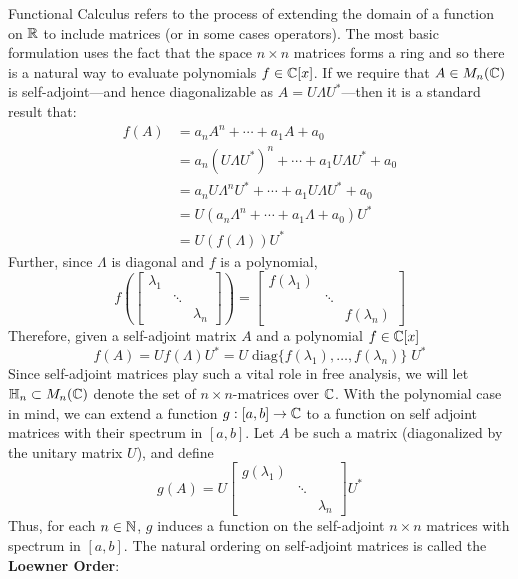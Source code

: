 Functional Calculus refers to the process of extending the domain of a function
on \(\mathbb{R}\) to include matrices (or in some cases operators). The most basic
formulation uses the fact that the space \(n \times n\) matrices forms a ring
and so there is a natural way to evaluate polynomials \(f \in \mathbb{C} [x]\). If we
require that $A \in M_n(\mathbb{C})$ is self-adjoint---and hence diagonalizable as
$A = U \Lambda U^*$---then it is a standard result that:
\begin{align*}
  f(A) &= a_nA^n + \cdots + a_1A + a_0 \\
  &= a_n \left( U\Lambda U^* \right) ^n + \cdots + a_1 U\Lambda U^* + a_0 \\
  &= a_n U\Lambda^n U^* + \cdots + a_1 U\Lambda U^* + a_0 \\
  &= U \left( a_n\Lambda ^n + \cdots + a_1\Lambda + a_0 \right) U^* \\
  &= U \left( f(\Lambda) \right) U^*
\end{align*}
Further, since \(\Lambda\) is diagonal and $f$ is a polynomial,
\[
  f \left( \begin{bmatrix} \lambda_1 &  &  \\  & \ddots &  \\  &  & \lambda_n \end{bmatrix}  \right)
  = \begin{bmatrix} f(\lambda_1) &  &  \\  & \ddots &  \\  &  & f(\lambda_n) \end{bmatrix}
\]
Therefore, given a self-adjoint matrix \(A\) and a polynomial \(f \in \mathbb{C} [x]\)
\[
  f(A) = Uf(\Lambda)U^* = U \;\text{diag}\{f(\lambda_{1}), \dots , f(\lambda_n)\} \; U^*
\]
Since self-adjoint matrices play such a vital role in free analysis, we will let
\(\mathbb{H}_n \subset M_n(\mathbb{C})\) denote the set of \(n \times n\)-matrices over \(\mathbb{C} \).
With the polynomial case in mind, we can extend a function \(g: [a,b] \to \mathbb{C} \)
to a function on self adjoint matrices with their
spectrum in \([a,b]\). Let \(A\) be such a matrix (diagonalized by the unitary
matrix \(U\)), and define
\[
  g(A) = U
  \begin{bmatrix} g(\lambda_1) & &\\ &\ddots& \\ & & \lambda_n \end{bmatrix}
  U^*
\]
Thus, for each \(n \in \mathbb{N} \), \(g\) induces a function on the self-adjoint
\(n \times n\) matrices with spectrum in \([a,b]\).  The natural ordering
 on self-adjoint matrices is called the
\textbf{Loewner Order}:

